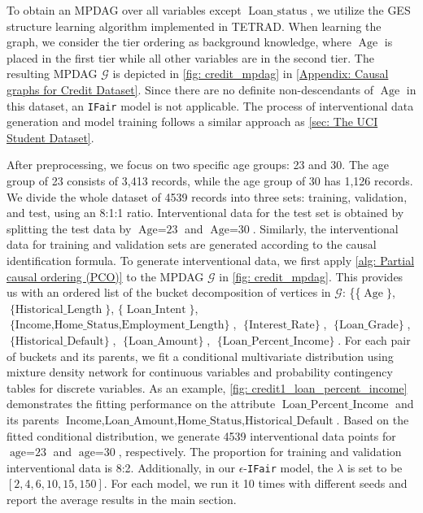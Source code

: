 \documentclass{article} %
\begin{document}
To obtain an MPDAG over all variables except $\operatorname{Loan\_status}$, we utilize the GES structure learning algorithm \citep{chickering2002learning} implemented in TETRAD. When learning the graph, we consider the tier ordering as background knowledge, where $\operatorname{Age}$ is placed in the first tier while all other variables are in the second tier. The resulting MPDAG $\mathcal{G}$ is depicted in \cref{fig: credit_mpdag} in \cref{Appendix: Causal graphs for Credit Dataset}. Since there are no definite non-descendants of $\operatorname{Age}$ in this dataset, an \texttt{IFair} model is not applicable. The process of interventional data generation and model training follows a similar approach as \cref{sec: The UCI Student Dataset}.

After preprocessing, we focus on two specific age groups: 23 and 30. The age group of 23 consists of 3,413 records, while the age group of 30 has 1,126 records. We divide the whole dataset of 4539 records into three sets: training, validation, and test, using an 8:1:1 ratio. Interventional data for the test set is obtained by splitting the test data by $\operatorname{Age=23}$ and $\operatorname{Age=30}$. Similarly, the interventional data for training and validation sets are generated according to the causal identification formula. To generate interventional data, we first apply \cref{alg: Partial causal ordering (PCO)} to the MPDAG $\mathcal{G}$ in \cref{fig: credit_mpdag}. This provides us with an ordered list of the bucket decomposition of vertices in $\mathcal{G}$: \{\{$\operatorname{Age}\}$, $\operatorname{\{Historical\_Length}\}$, $\{\operatorname{Loan\_Intent}\}$, $\operatorname{\{Income, Home\_Status, Employment\_Length\}}$, $\operatorname{\{Interest\_Rate\}}$, $\operatorname{\{Loan\_Grade\}}$, $\operatorname{\{Historical\_Default\}}$, $\operatorname{\{Loan\_Amount\}}$, $\operatorname{\{Loan\_Percent\_Income\}}$. For each pair of buckets and its parents, we fit a conditional multivariate distribution using mixture density network \cite{bishop1994mixture} for continuous variables and probability contingency tables for discrete variables. As an example, \cref{fig: credit1_loan_percent_income} demonstrates the fitting performance on the attribute $\operatorname{Loan\_Percent\_Income}$ and its parents $\operatorname{Income, Loan\_Amount, Home\_Status, Historical\_Default}$. Based on the fitted conditional distribution, we generate 4539 interventional data points for $\operatorname{age=23}$ and $\operatorname{age=30}$, respectively. The proportion for training and validation interventional data is 8:2. Additionally, in our $\epsilon$-\texttt{IFair} model, the $\lambda$ is set to be $[2,4,6,10,15,150]$. For each model, we run it 10 times with different seeds and report the average results in the main section.
\end{document}
